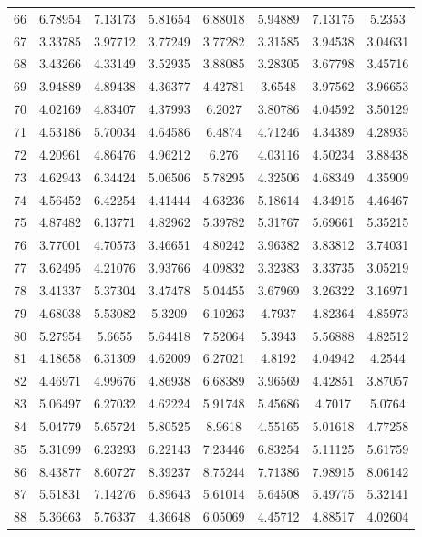 \begin{center}
\begin{longtable}{cccccccc}
66 & 6.78954 & 7.13173 & 5.81654 & 6.88018 & 5.94889 & 7.13175 & 5.2353\\
67 & 3.33785 & 3.97712 & 3.77249 & 3.77282 & 3.31585 & 3.94538 & 3.04631\\
68 & 3.43266 & 4.33149 & 3.52935 & 3.88085 & 3.28305 & 3.67798 & 3.45716\\
69 & 3.94889 & 4.89438 & 4.36377 & 4.42781 & 3.6548 & 3.97562 & 3.96653\\
70 & 4.02169 & 4.83407 & 4.37993 & 6.2027 & 3.80786 & 4.04592 & 3.50129\\
71 & 4.53186 & 5.70034 & 4.64586 & 6.4874 & 4.71246 & 4.34389 & 4.28935\\
72 & 4.20961 & 4.86476 & 4.96212 & 6.276 & 4.03116 & 4.50234 & 3.88438\\
73 & 4.62943 & 6.34424 & 5.06506 & 5.78295 & 4.32506 & 4.68349 & 4.35909\\
74 & 4.56452 & 6.42254 & 4.41444 & 4.63236 & 5.18614 & 4.34915 & 4.46467\\
75 & 4.87482 & 6.13771 & 4.82962 & 5.39782 & 5.31767 & 5.69661 & 5.35215\\
76 & 3.77001 & 4.70573 & 3.46651 & 4.80242 & 3.96382 & 3.83812 & 3.74031\\
77 & 3.62495 & 4.21076 & 3.93766 & 4.09832 & 3.32383 & 3.33735 & 3.05219\\
78 & 3.41337 & 5.37304 & 3.47478 & 5.04455 & 3.67969 & 3.26322 & 3.16971\\
79 & 4.68038 & 5.53082 & 5.3209 & 6.10263 & 4.7937 & 4.82364 & 4.85973\\
80 & 5.27954 & 5.6655 & 5.64418 & 7.52064 & 5.3943 & 5.56888 & 4.82512\\
81 & 4.18658 & 6.31309 & 4.62009 & 6.27021 & 4.8192 & 4.04942 & 4.2544\\
82 & 4.46971 & 4.99676 & 4.86938 & 6.68389 & 3.96569 & 4.42851 & 3.87057\\
83 & 5.06497 & 6.27032 & 4.62224 & 5.91748 & 5.45686 & 4.7017 & 5.0764\\
84 & 5.04779 & 5.65724 & 5.80525 & 8.9618 & 4.55165 & 5.01618 & 4.77258\\
85 & 5.31099 & 6.23293 & 6.22143 & 7.23446 & 6.83254 & 5.11125 & 5.61759\\
86 & 8.43877 & 8.60727 & 8.39237 & 8.75244 & 7.71386 & 7.98915 & 8.06142\\
87 & 5.51831 & 7.14276 & 6.89643 & 5.61014 & 5.64508 & 5.49775 & 5.32141\\
88 & 5.36663 & 5.76337 & 4.36648 & 6.05069 & 4.45712 & 4.88517 & 4.02604\\

\end{longtable}
\end{center}
